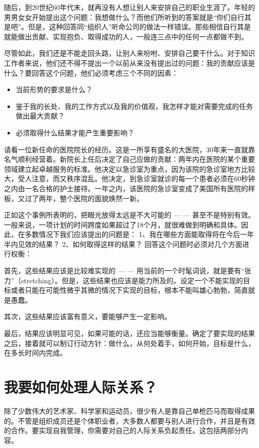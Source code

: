 \documentclass[a4paper,12pt,lang=cn,fontset = windows]{elegantpaper} %
\begin{document}
随后，到20世纪60年代末，就再没有人想让别人来安排自己的职业生涯了。年轻的男男女女开始提出这个问题：我想做什么？而他们所听到的答案就是“你们自行其是吧”。但是，这种回答同“组织人”听命公司的做法一样错误。那些相信自行其是就能做出贡献、实现抱负、取得成功的人，一般连三点中的任何一点都做不到。

尽管如此，我们还是不能走回头路，让别人来吩咐、安排自己要干什么。对于知识工作者来说，他们还不得不提出一个以前从来没有提出过的问题：我的贡献应该是什么？要回答这个问题，他们必须考虑三个不同的因素：
\begin{itemize}
    \item \noindent 当前形势的要求是什么？
    
    \item \noindent 鉴于我的长处、我的工作方式以及我的价值观，我怎样才能对需要完成的任务做出最大贡献？
    
    \item \noindent 必须取得什么结果才能产生重要影响？
    \end{itemize}

请看一位新任命的医院院长的经历。这是一所享有盛名的大医院，30年来一直就靠名气顺利经营着。新院长上任后决定了自己应做的贡献：两年内在医院的某个重要领域建立起卓越服务的标准。他决定以急诊室为重点，因为该院的急诊室地方比较大，受人注意，而又秩序混乱。他决定，到急诊室就诊的每一个患者必须在60秒钟之内由一名合格的护士接待。一年之内，该医院的急诊室变成了美国所有医院的样板，又过了两年，整个医院的面貌焕然一新。

正如这个事例所表明的，把眼光放得太远是不大可能的 — — 甚至不是特别有效。一般来说，一项计划的时间跨度如果超过了18个月，就很难做到明确和具体。因此，在多数情况下我们应该提出的问题是：
1、我在哪些方面能取得将在今后一年半内见效的结果？
2、如何取得这样的结果？
回答这个问题时必须对几个方面进行权衡：

首先，这些结果应该是比较难实现的 — — 用当前的一个时髦词说，就是要有“张力”（stretching）。但是，这些结果也应该是能力所及的。设定一个不能实现的目标或者只能在可能性微乎其微的情况下实现的目标，根本不能叫雄心勃勃，简直就是愚蠢。

其次，这些结果应该富有意义，要能够产生一定影响。

最后，结果应该明显可见，如果可能的话，还应当能够衡量。确定了要实现的结果之后，接着就可以制订行动方针：做什么，从何处着手，如何开始，目标是什么，在多长时间内完成。

\section{我要如何处理人际关系？}
除了少数伟大的艺术家、科学家和运动员，很少有人是靠自己单枪匹马而取得成果的。不管是组织成员还是个体职业者，大多数人都要与别人进行合作，并且是有效的合作。要实现自我管理，你需要对自己的人际关系负起责任。这包括两部分内容。
\end{document}
